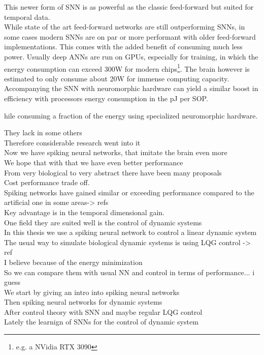 This newer form of \ac{SNN} is as powerful as the classic feed-forward but suited for temporal data.\\
While state of the art feed-forward networks are still outperforming \acp{SNN}, in some cases modern \acp{SNN} are on par or more performant with older feed-forward implementations. This comes with the added benefit of consuming much less power. Usually deep \acp{ANN} are run on \acp{GPU}, especially for training, in which the energy consumption can exceed 300W for modern chips\footnote{e.g. a NVidia RTX 3090}. The brain however is estimated to only consume about
20W \cite{clarke_circulation_1999} for immense computing capacity. Accompanying the \ac{SNN} with neuromorphic hardware can yield a similar boost in efficiency with processors energy consumption in the pJ per \ac{SOP}\cite{indiveri_importance_2019}.

hile consuming a fraction of the energy using specialized neuromorphic hardware.



They lack in some others\\
Therefore considerable research went into it\\
Now we have spiking neural networks, that imitate the brain even more\\
We hope that with that we have even better performance\\
From very biological to very abstract there have been many proposals\\
Cost performance trade off.\\
Spiking networks have gained similar or exceeding performance compared to the artificial one in some areas-> refs\\
Key advantage is in the temporal dimensional gain.\\
One field they are suited well is the control of dynamic systems\\
In this thesis we use a spiking neural network to control a linear dynamic system\\
The usual way to simulate biological dynamic systems is using LQG control -> ref\\
I believe because of the energy minimization\\
So we can compare them with usual NN and control in terms of performance... i guess\\
We start by giving an intro into spiking neural networks\\
Then spiking neural networks for dynamic systems\\
After control theory with SNN and maybe regular LQG control\\
Lately the learnign of SNNs for the control of dynamic system\\

